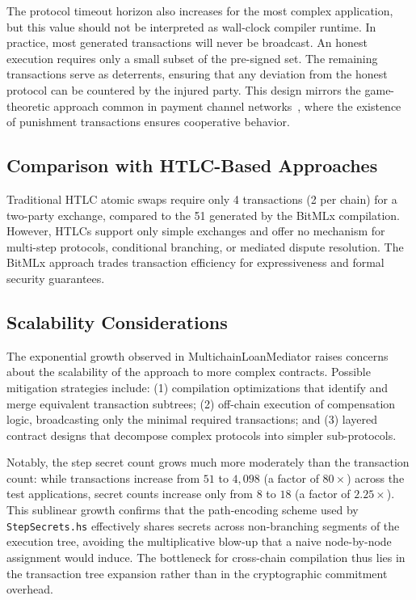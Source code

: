 \documentclass[journal]{IEEEtran}
\begin{document}
The protocol timeout horizon also increases for the most complex application, but this value should not be interpreted as wall-clock compiler runtime. In practice, most generated transactions will never be broadcast. An honest execution requires only a small subset of the pre-signed set. The remaining transactions serve as deterrents, ensuring that any deviation from the honest protocol can be countered by the injured party. This design mirrors the game-theoretic approach common in payment channel networks~\cite{gudgeon2020defi}, where the existence of punishment transactions ensures cooperative behavior.

\subsection{Comparison with HTLC-Based Approaches}

Traditional HTLC atomic swaps require only 4 transactions (2 per chain) for a two-party exchange, compared to the 51 generated by the BitMLx compilation. However, HTLCs support only simple exchanges and offer no mechanism for multi-step protocols, conditional branching, or mediated dispute resolution. The BitMLx approach trades transaction efficiency for expressiveness and formal security guarantees.

\subsection{Scalability Considerations}
\label{sec:scalability}

The exponential growth observed in MultichainLoanMediator raises concerns about the scalability of the approach to more complex contracts. Possible mitigation strategies include: (1) compilation optimizations that identify and merge equivalent transaction subtrees; (2) off-chain execution of compensation logic, broadcasting only the minimal required transactions; and (3) layered contract designs that decompose complex protocols into simpler sub-protocols.

Notably, the step secret count grows much more moderately than the transaction count: while transactions increase from $51$ to $4{,}098$ (a factor of $80\times$) across the test applications, secret counts increase only from $8$ to $18$ (a factor of $2.25\times$). This sublinear growth confirms that the path-encoding scheme used by \texttt{StepSecrets.hs} effectively shares secrets across non-branching segments of the execution tree, avoiding the multiplicative blow-up that a naive node-by-node assignment would induce. The bottleneck for cross-chain compilation thus lies in the transaction tree expansion rather than in the cryptographic commitment overhead.
\end{document}
